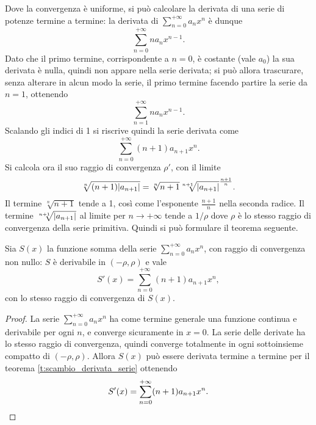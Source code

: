 Dove la convergenza è uniforme, si può calcolare la derivata di una serie di potenze termine a termine: la derivata di $\sum_{n=0}^{+\infty}a_nx^n$ è dunque
\[
\sum_{n=0}^{+\infty}na_nx^{n-1}.
\]
Dato che il primo termine, corrispondente a $n=0$, è costante (vale $a_0$) la sua derivata è nulla, quindi non appare nella serie derivata; si può allora trascurare, senza alterare in alcun modo la serie, il primo termine facendo partire la serie da $n=1$, ottenendo
\[
\sum_{n=1}^{+\infty}na_nx^{n-1}.
\]
Scalando gli indici di 1 si riscrive quindi la serie derivata come
\[
\sum_{n=0}^{+\infty}(n+1)a_{n+1}x^n.
\]
Si calcola ora il suo raggio di convergenza $\rho'$, con il limite
\[
\sqrt[n]{(n+1)\lvert a_{n+1}\rvert}=\sqrt[n]{n+1}\sqrt[n+1]{\lvert a_{n+1}\rvert}^{\frac{n+1}{n}}.
\]
Il termine $\sqrt[n]{n+1}$ tende a 1, così come l'esponente $\frac{n+1}{n}$ nella seconda radice. Il termine $\sqrt[n+1]{\lvert a_{n+1}\rvert}$ al limite per $n\to+\infty$ tende a $1/\rho$ dove $\rho$ è lo stesso raggio di convergenza della serie primitiva. Quindi si può formulare il teorema seguente.
\begin{teorema}
Sia $S(x)$ la funzione somma della serie $\sum_{n=0}^{+\infty}a_nx^n$, con raggio di convergenza non nullo: $S$ è derivabile in $(-\rho,\rho)$ e vale
\[
S'(x)=\sum_{n=0}^{+\infty}(n+1)a_{n+1}x^n,
\]
con lo stesso raggio di convergenza di $S(x)$.
\end{teorema}
\begin{proof}
La serie $\sum_{n=0}^{+\infty}a_nx^n$ ha come termine generale una funzione continua e derivabile per ogni $n$, e converge sicuramente in $x=0$. La serie delle derivate ha lo stesso raggio di convergenza, quindi converge totalmente in ogni sottoinsieme compatto di $(-\rho,\rho)$. Allora $S(x)$ può essere derivata termine a termine per il teorema \ref{t:scambio_derivata_serie} ottenendo
\[
S'(x)=\sum_{n=0}^{+\infty}(n+1)a_{n+1}x^n.\qedhere
\]
\end{proof}

